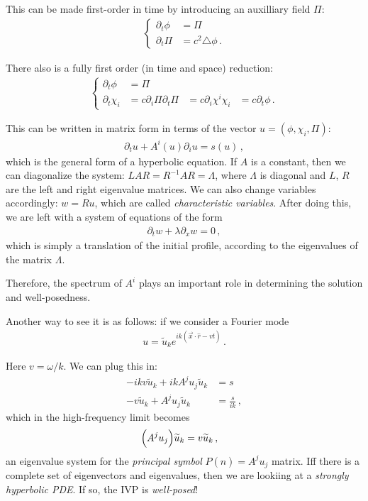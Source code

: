 \documentclass[main.tex]{subfiles}
\begin{document}
This can be made first-order in time by introducing an auxilliary field \(\Pi \): 
%
\begin{align}
\begin{cases}
    \partial_{t} \phi &= \Pi   \\
    \partial_{t} \Pi &= c^2 \triangle \phi 
\,.
\end{cases}
\end{align}

There also is a fully first order (in time and space) reduction: 
%
\begin{align}
\begin{cases}
    \partial_{t} \phi &= \Pi  \\
    \partial_{t} \chi_i &= c \partial_{i} \Pi 
    \partial_{t} \Pi &= c \partial_{i} \chi^{i}
    \chi_i &= c \partial_{t} \phi 
\,.
\end{cases}
\end{align}

This can be written in matrix form in terms  of the vector \(u = (\phi , \chi _i, \Pi )\): 
%
\begin{align}
\partial_{t} u + A^{i} (u) \partial_{i} u = s(u)
\,,
\end{align}
%
which is the general form of a hyperbolic equation. 
If \(A\) is a constant, then we can diagonalize the system: \(LAR = R^{-1} A R = \Lambda \), where \(\Lambda \) is diagonal and \(L\), \(R \) are the left and right eigenvalue matrices. 
We can also change variables accordingly: \(w = R u\), which are called \emph{characteristic variables}. 
After doing this, we are left with a system of equations of the form 
%
\begin{align}
\partial_{t} w + \lambda \partial_{x} w = 0
\,,
\end{align}
%
which is simply a translation of the initial profile, according to the eigenvalues of the matrix \(\Lambda \). 

Therefore, the spectrum of \(A^{i}\) plays an important role in determining the solution and well-posedness. 

Another way to see it is as follows: if we consider a Fourier mode 
%
\begin{align}
u = \widetilde{u}_k e^{ik (\vec{x} \cdot \hat{r} - vt)}
\,.
\end{align}

Here \(v = \omega / k\). 
We can plug this in: 
%
\begin{align}
- i k v \widetilde{u}_k + ik A^{j} u_j \widetilde{u}_k &= s  \\
 - v \widetilde{u}_k + A^{j} u_j \widetilde{u}_k &= \frac{s}{ik}
\,,
\end{align}
%
which in the high-frequency limit becomes 
%
\begin{align}
\qty(A^{j} u_j) \widetilde{u}_k &= v \widetilde{u}_k
\,,
\end{align}
%
an eigenvalue system for the \emph{principal symbol } \(P(\hat{n}) = A^{j} u_j\) matrix.
Iff there is a complete set of eigenvectors and eigenvalues, then we are lookiing at a \emph{strongly hyperbolic PDE}. 
If so, the IVP is \emph{well-posed}! 
\end{document}
